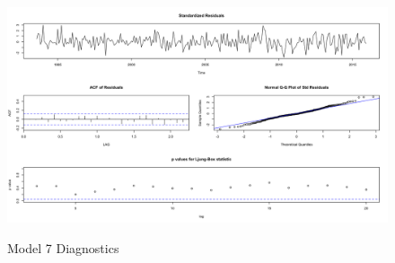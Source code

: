 {\begin{figure}[H]
      	\centering
      	\caption{Model 7 Diagnostics}
      	\includegraphics[width=\linewidth]{images/mod7}
      	\label{fig:mod7}
\end{figure}

\begin{flushleft}
\end{flushleft}
}
  

